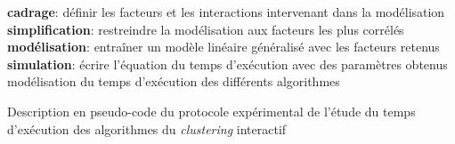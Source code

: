 \begin{algorithm}[!htb]
\begin{algorithmic}[1]
					\EndFor
						\State \textbf{cadrage}: définir les facteurs et les interactions intervenant dans la modélisation
						\State \textbf{simplification}: restreindre la modélisation aux facteurs les plus corrélés
						\State \textbf{modélisation}: entraîner un modèle linéaire généralisé avec les facteurs retenus
						\State \textbf{simulation}: écrire l'équation du temps d'exécution avec des paramètres obtenus
					\EndFor
					\Ensure modélisation du temps d'exécution des différents algorithmes
				\end{algorithmic}
				\caption{Description en pseudo-code du protocole expérimental de l'étude du temps d'exécution des algorithmes du \textit{clustering} interactif}
				\label{algorithm:4.3.2-ETUDE-COUTS-TEMPS-CALCUL-PROTOCOLE}
			\end{algorithm}
			
